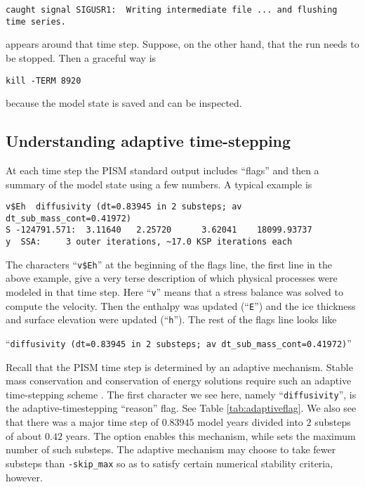 \begin{verbatim}
caught signal SIGUSR1:  Writing intermediate file ... and flushing time series.
\end{verbatim}
\noindent appears around that time step.  Suppose, on the other hand, that the run needs to be stopped.  Then a graceful way is

\begin{verbatim}
kill -TERM 8920
\end{verbatim}

\noindent because the model state is saved and can be inspected.



\subsection{Understanding adaptive time-stepping} \label{subsect:adapt}

At each time step the PISM standard output includes ``flags'' and then a summary of the model state using a few numbers.  A typical example is
\small
\begin{verbatim}
v$Eh  diffusivity (dt=0.83945 in 2 substeps; av dt_sub_mass_cont=0.41972)
S -124791.571:  3.11640   2.25720      3.62041    18099.93737
y  SSA:     3 outer iterations, ~17.0 KSP iterations each
\end{verbatim}
\normalsize

The characters ``\texttt{v\$Eh}'' at the beginning of the flags line, the first line in the above example, give a very terse description of which physical processes were modeled in that time step.  Here ``\texttt{v}'' means that a stress balance was solved to compute the velocity.  Then the enthalpy was updated (``\texttt{E}'') and the ice thickness and surface elevation were updated (``\texttt{h}'').  The rest of the flags line looks like

  ``\texttt{diffusivity (dt=0.83945 in 2 substeps; av dt_sub_mass_cont=0.41972)}''

\noindent Recall that the PISM time step is determined by an
adaptive mechanism.  Stable mass conservation and conservation of energy solutions
require such an adaptive time-stepping scheme \cite{BBL}.  The first character
we see here, namely ``\texttt{diffusivity}'', is the adaptive-timestepping ``reason''
flag.  See Table \ref{tab:adaptiveflag}.  We also see that
there was a major time step of $0.83945$ model years divided into $2$ substeps of
about $0.42$ years.  The  option enables this mechanism, while
 sets the maximum number of such substeps.  The adaptive
mechanism may choose to take fewer substeps than \texttt{-skip_max} so as to
satisfy certain numerical stability criteria, however.

